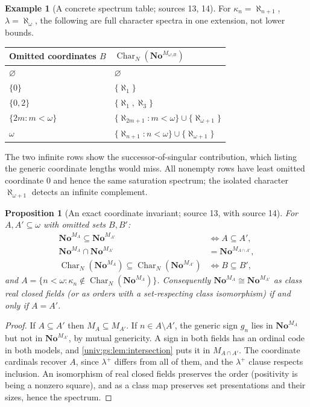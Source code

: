 \documentclass[11pt,letterpaper]{article}
\numberwithin{equation}{section}
\newtheorem{proposition}[proposition]{Proposition}
\theoremstyle{definition}
\newtheorem{example}[example]{Example}
\theoremstyle{remark}
\newcommand{\No}{\mathbf{No}}
\newcommand{\Char}{\operatorname{Char}}
\begin{document}
\begin{example}[A concrete spectrum table; sources 13, 14]\label{univ:gs:ex:table}
For $\kappa_n=\aleph_{n+1}$, $\lambda=\aleph_\omega$, the following are full character
spectra in one extension, not lower bounds.
\begin{center}\small
\begin{tabular}{@{}P{0.3\textwidth}P{0.55\textwidth}@{}}
\toprule
Omitted coordinates $B$ & $\Char_N(\No^{M_{\omega\setminus B}})$\\
\midrule
$\varnothing$ & $\varnothing$\\
$\{0\}$ & $\{\aleph_1\}$\\
$\{0,2\}$ & $\{\aleph_1,\aleph_3\}$\\
$\{2m:m<\omega\}$ & $\{\aleph_{2m+1}:m<\omega\}\cup\{\aleph_{\omega+1}\}$\\
$\omega$ & $\{\aleph_{n+1}:n<\omega\}\cup\{\aleph_{\omega+1}\}$\\
\bottomrule
\end{tabular}
\end{center}
The two infinite rows show the successor-of-singular contribution, which listing the
generic coordinate lengths would miss. All nonempty rows have least omitted coordinate
$0$ and hence the same saturation spectrum; the isolated character $\aleph_{\omega+1}$
detects an infinite complement.
\end{example}

\begin{proposition}[An exact coordinate invariant; source 13, with source 14]\label{univ:gs:prop:coordorder}
For $A,A'\subseteq\omega$ with omitted sets $B,B'$:
\begin{align*}
 \No^{M_A}\subseteq\No^{M_{A'}}&\iff A\subseteq A',\\
 \No^{M_A}\cap\No^{M_{A'}}&=\No^{M_{A\cap A'}},\\
 \Char_N(\No^{M_A})\subseteq\Char_N(\No^{M_{A'}})&\iff B\subseteq B',
\end{align*}
and $A=\{n<\omega:\kappa_n\notin\Char_N(\No^{M_A})\}$. Consequently $\No^{M_A}\cong\No^{M_{A'}}$
as class real closed fields (or as orders with a set-respecting class isomorphism) if and
only if $A=A'$.
\end{proposition}
\begin{proof}
If $A\subseteq A'$ then $M_A\subseteq M_{A'}$. If $n\in A\setminus A'$, the generic sign
$g_n$ lies in $\No^{M_A}$ but not in $\No^{M_{A'}}$, by mutual genericity. A sign in both
fields has an ordinal code in both models, and \cref{univ:gs:lem:intersection} puts it in
$M_{A\cap A'}$. The coordinate cardinals recover $A$, since $\lambda^+$ differs from all
of them, and the $\lambda^+$ clause respects inclusion. An isomorphism of real closed
fields preserves the order (positivity is being a nonzero square), and as a class map
preserves set presentations and their sizes, hence the spectrum.
\end{proof}
\end{document}
